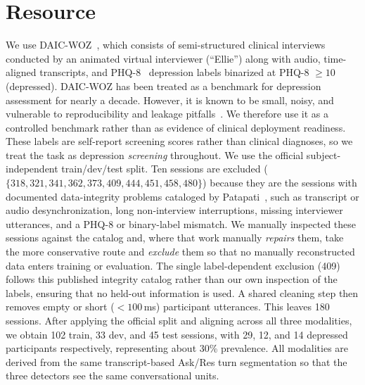 \documentclass{article}
\begin{document}
\section{Resource}
\label{sec:data}
We use DAIC-WOZ~\cite{gratch2014daic}, which consists of semi-structured clinical interviews conducted by an animated virtual interviewer (``Ellie'') along with audio, time-aligned transcripts, and PHQ-8~\cite{kroenke2009phq8} depression labels binarized at PHQ-8 $\geq 10$ (depressed). 
DAIC-WOZ has been treated as a benchmark for depression assessment for nearly a decade. However, it is known to be small, noisy, and vulnerable to reproducibility and leakage pitfalls~\cite{danylenko2026pitfalls}. 
We therefore use it as a controlled benchmark rather than as evidence of clinical deployment readiness. These labels are self-report screening scores rather than clinical diagnoses, so we treat the task as depression \emph{screening} throughout. 
We use the official subject-independent train/dev/test split. Ten sessions are excluded ($\{318, 321, 341, 362, 373, 409, 444, 451, 458, 480\}$) because they are the sessions with documented data-integrity problems cataloged by Patapati~\cite{patapati2024integrating}, such as transcript or audio desynchronization, long non-interview interruptions, missing interviewer utterances, and a PHQ-8 or binary-label mismatch. 
We manually inspected these sessions against the catalog and, where that work manually \emph{repairs} them, take the more conservative route and \emph{exclude} them so that no manually reconstructed data enters training or evaluation. 
The single label-dependent exclusion (409) follows this published integrity catalog rather than our own inspection of the labels, ensuring that no held-out information is used. 
A shared cleaning step then removes empty or short ($<100$\,ms) participant utterances. This leaves 180 sessions. 
After applying the official split and aligning across all three modalities, we obtain 102 train, 33 dev, and 45 test sessions, with 29, 12, and 14 depressed participants respectively, representing about 30\% prevalence. 
All modalities are derived from the same transcript-based Ask/Res turn segmentation so that the three detectors see the same conversational units.
\end{document}
